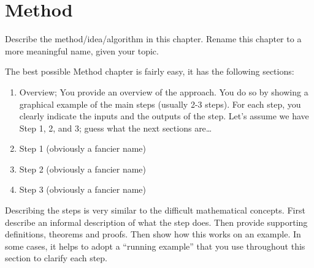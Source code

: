 \chapter{Method}
\label{chap:method}

Describe the method/idea/algorithm in this chapter.
Rename this chapter to a more meaningful name, given your topic.

The best possible Method chapter is fairly easy, it has the following sections:
\begin{enumerate}
    \item Overview; You provide an overview of the approach. You do so by showing a graphical example of the main steps (usually 2-3 steps).
    For each step, you clearly indicate the inputs and the outputs of the step. Let's assume we have Step 1, 2, and 3; guess what the next sections are\dots
    \item Step 1 (obviously a fancier name)
    \item Step 2 (obviously a fancier name)
    \item Step 3 (obviously a fancier name)
\end{enumerate}
Describing the steps is very similar to the difficult mathematical concepts.
First describe an informal description of what the step does.
Then provide supporting definitions, theorems and proofs.
Then show how this works on an example.
In some cases, it helps to adopt a \enquote{running example} that you use throughout this section to clarify each step.
